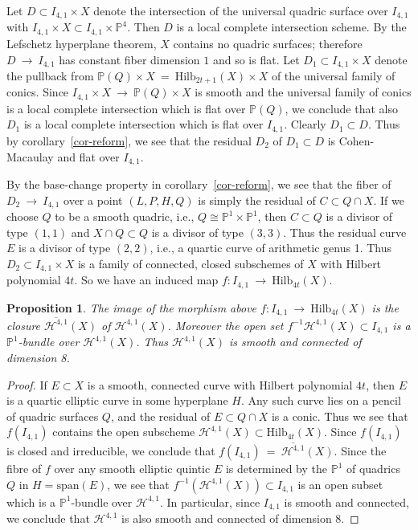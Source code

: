\documentclass[twoside,12pt,reqno]{amsart}
\theoremstyle{plain}
\newtheorem{prop}[thm]{Proposition}
\theoremstyle{definition}
\newcommand{\Hdg}[2]{\mathcal{H}^{#1,#2}}
\newcommand{\PP}{\mathbb{P}}
\newcommand{\HI}[2]{\text{Hilb}_{#1}(#2)}
\def\ps{\vspace{4pt}}
\begin{document}
\ps

Let $D\subset I_{4,1}\times X$
denote the intersection of the universal quadric surface over $I_{4,1}$ with 
$I_{4,1}\times X\subset I_{4,1}\times \PP^4$.  Then $D$ is a local complete
intersection scheme.  By the Lefschetz hyperplane theorem, $X$
contains no quadric surfaces; therefore $D~\rightarrow~ I_{4,1}$ has constant
fiber dimension $1$ and so is flat.  Let $D_1\subset I_{4,1}\times X$ denote
the pullback from $\PP(Q)\times X ~=~\HI{2t+1}{X}\times X$ of the
universal family of conics.  Since $I_{4,1}\times X~\rightarrow~ \PP(Q)\times
X$ is smooth and the universal family of conics is a local complete
intersection which is flat over $\PP(Q)$, we conclude that also $D_1$ is a
local complete intersection which is flat over $I_{4,1}$.  Clearly
$D_1\subset D$.  Thus by corollary~\ref{cor-reform}, we see that the
residual $D_2$ of $D_1\subset D$ is Cohen-Macaulay and flat over $I_{4,1}$.

\ps

By the base-change property in corollary~\ref{cor-reform}, we see that
the fiber of $D_2~\rightarrow~ I_{4,1}$ over a point $(L,P,H,Q)$ is simply the
residual of $C\subset Q\cap X$.  If we choose $Q$ to be a smooth
quadric, i.e., $Q\cong \PP^1\times \PP^1$, then $C\subset Q$ is a
divisor of type $(1,1)$ and $X\cap Q\subset Q$ is a divisor of type
$(3,3)$.  Thus the residual curve $E$ is a divisor of type $(2,2)$,
i.e., a quartic curve of arithmetic genus 1.  Thus $D_2\subset I_{4,1}\times
X$ is a family of connected, closed subschemes of $X$ with Hilbert
polynomial $4t$.  So we have an induced map $f:I_{4,1}~\rightarrow~
\HI{4t}{X}$.  

\ps

\begin{prop}\label{lem-qell}  The image of the morphism above
$f:I_{4,1}~\rightarrow~\HI{4t}{X}$ is the closure $\overline{\Hdg{4}{1}}(X)$ 
of $\Hdg{4}{1}(X)$.  Moreover the open set $f^{-1}\Hdg{4}{1}(X)\subset 
I_{4,1}$ is a $\PP^1$-bundle over $\Hdg{4}{1}(X)$.  Thus $\Hdg{4}{1}(X)$ is
smooth and connected of dimension 8.
\end{prop}

\begin{proof}
If $E\subset X$ is a smooth, connected curve with Hilbert polynomial
$4t$, then $E$ is a quartic elliptic curve in some hyperplane $H$.
Any such curve lies on a pencil of quadric surfaces $Q$,  and the
residual of $E\subset Q\cap X$ is a conic.  Thus we see that $f(I_{4,1})$
contains the open subscheme $\Hdg{4}{1}(X)\subset \HI{4t}{X}$.  Since
$f(I_{4,1})$ is closed and irreducible, we conclude that
$f(I_{4,1})~=~\overline{\Hdg{4}{1}}(X)$.  Since the fibre of $f$
over any smooth elliptic quintic $E$ is determined by the $\PP^1$ of 
quadrics $Q$ in $H=\text{span}(E)$, we see that
$f^{-1}(\Hdg{4}{1}(X))\subset I_{4,1}$ is an open subset which is a
$\PP^1$-bundle over $\Hdg{4}{1}$.  In particular, since $I_{4,1}$ is smooth
and connected,
we conclude that $\Hdg{4}{1}$ is also smooth and connected of
dimension 8.
\end{proof}
\end{document}
